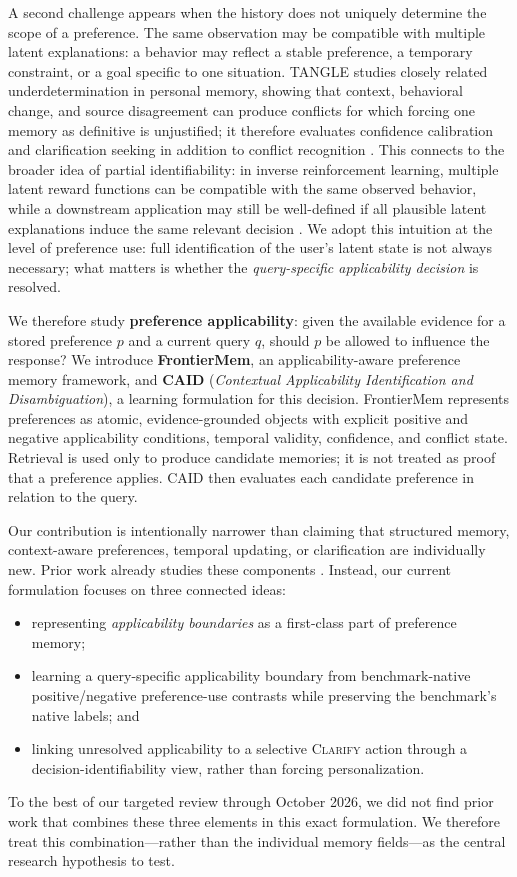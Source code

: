 \documentclass[11pt]{article}
\begin{document}
A second challenge appears when the history does not uniquely determine the scope of a preference. The same observation may be compatible with multiple latent explanations: a behavior may reflect a stable preference, a temporary constraint, or a goal specific to one situation. TANGLE studies closely related underdetermination in personal memory, showing that context, behavioral change, and source disagreement can produce conflicts for which forcing one memory as definitive is unjustified; it therefore evaluates confidence calibration and clarification seeking in addition to conflict recognition \cite{yang2026tangle}. This connects to the broader idea of partial identifiability: in inverse reinforcement learning, multiple latent reward functions can be compatible with the same observed behavior, while a downstream application may still be well-defined if all plausible latent explanations induce the same relevant decision \cite{skalse2026partial}. We adopt this intuition at the level of preference use: full identification of the user's latent state is not always necessary; what matters is whether the \emph{query-specific applicability decision} is resolved.

We therefore study \textbf{preference applicability}: given the available evidence for a stored preference $p$ and a current query $q$, should $p$ be allowed to influence the response? We introduce \textbf{FrontierMem}, an applicability-aware preference memory framework, and \textbf{CAID} (\emph{Contextual Applicability Identification and Disambiguation}), a learning formulation for this decision. FrontierMem represents preferences as atomic, evidence-grounded objects with explicit positive and negative applicability conditions, temporal validity, confidence, and conflict state. Retrieval is used only to produce candidate memories; it is not treated as proof that a preference applies. CAID then evaluates each candidate preference in relation to the query.

Our contribution is intentionally narrower than claiming that structured memory, context-aware preferences, temporal updating, or clarification are individually new. Prior work already studies these components \cite{gao2026s2pref,sun2026pamu,hou2026personatree,wang2026qumem,yang2026tangle}. Instead, our current formulation focuses on three connected ideas:
\begin{itemize}
    \item representing \emph{applicability boundaries} as a first-class part of preference memory;
    \item learning a query-specific applicability boundary from benchmark-native positive/negative preference-use contrasts while preserving the benchmark's native labels; and
    \item linking unresolved applicability to a selective \textsc{Clarify} action through a decision-identifiability view, rather than forcing personalization.
\end{itemize}
To the best of our targeted review through October 2026, we did not find prior work that combines these three elements in this exact formulation. We therefore treat this combination---rather than the individual memory fields---as the central research hypothesis to test.
\end{document}
